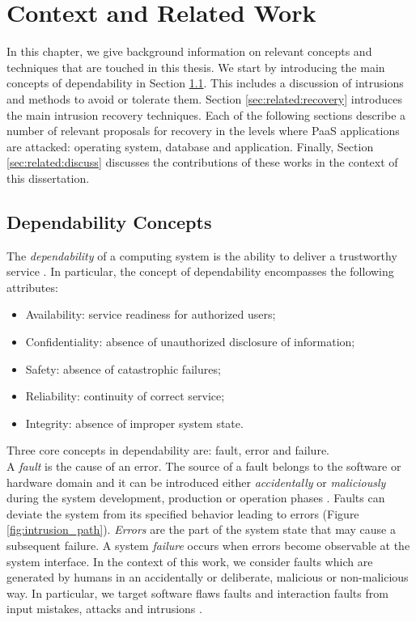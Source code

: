 \chapter{Context and Related Work}
\label{chapter:related_work}
In this chapter, we give background information on relevant concepts and techniques that are touched in this thesis. We start by introducing the main concepts of dependability in Section \ref{sec:related:dependability_concepts}. This includes a discussion of intrusions and methods to avoid or tolerate them. Section \ref{sec:related:recovery} introduces the main intrusion recovery techniques. Each of the following sections describe a number of relevant proposals for recovery in the levels where \ac{PaaS} applications are attacked: operating system, database and application. Finally, Section \ref{sec:related:discuss} discusses the contributions of these works in the context of this dissertation.

\section{Dependability Concepts}
\label{sec:related:dependability_concepts}
The \emph{dependability} of a computing system is the ability to deliver a trustworthy service \cite{Aviz}. In particular, the concept of dependability encompasses the following attributes: 
\begin{itemize}
\item Availability: service readiness for authorized users; 
\item Confidentiality: absence of unauthorized disclosure of information; 
\item Safety: absence of catastrophic failures; 
\item Reliability: continuity of correct service; 
\item Integrity: absence of improper system state.
\end{itemize}
\bigskip

Three core concepts in dependability are: fault, error and failure.\\
A \emph{fault} is the cause of an error. The source of a fault belongs to the software or hardware domain and it can be introduced either \emph{accidentally} or \emph{maliciously} during the system development, production or operation phases \cite{Landwehr1992,Aviz}. Faults can deviate the system from its specified behavior leading to errors (Figure \ref{fig:intrusion_path}). \emph{Errors} are the part of the system state that may cause a subsequent failure. A system \emph{failure} occurs when errors become observable at the system interface. In the context of this work, we consider faults which are generated by humans in an accidentally or deliberate, malicious or non-malicious way. In particular, we target software flaws faults and interaction faults from input mistakes, attacks and intrusions \cite{Aviz}. \\  


